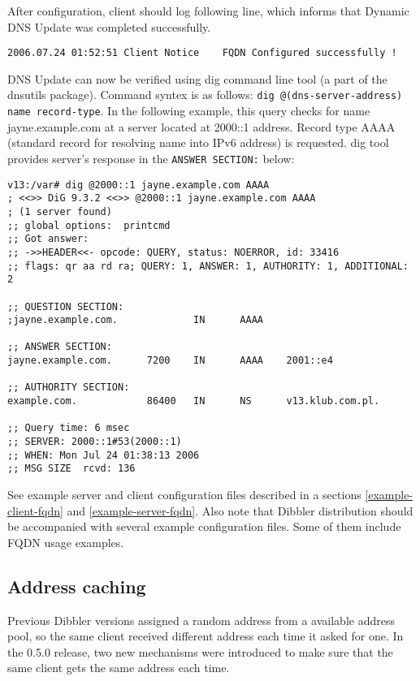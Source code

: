 After configuration, client should log following line, which informs
that Dynamic DNS Update was completed successfully.

\begin{verbatim}
2006.07.24 01:52:51 Client Notice    FQDN Configured successfully !
\end{verbatim}

DNS Update can now be verified using dig command line tool (a part of
the dnsutils package). Command syntex is as follows: \verb+dig @(dns-server-address) name record-type+. In the following example,
this query checks for name jayne.example.com at a server located at
2000::1 address. Record type AAAA (standard record for resolving name
into IPv6 address) is requested. dig tool provides server's response
in the \verb+ANSWER SECTION:+ below:

\begin{Verbatim}
v13:/var# dig @2000::1 jayne.example.com AAAA
; <<>> DiG 9.3.2 <<>> @2000::1 jayne.example.com AAAA
; (1 server found)
;; global options:  printcmd
;; Got answer:
;; ->>HEADER<<- opcode: QUERY, status: NOERROR, id: 33416
;; flags: qr aa rd ra; QUERY: 1, ANSWER: 1, AUTHORITY: 1, ADDITIONAL: 2

;; QUESTION SECTION:
;jayne.example.com.             IN      AAAA

;; ANSWER SECTION:
jayne.example.com.      7200    IN      AAAA    2001::e4

;; AUTHORITY SECTION:
example.com.            86400   IN      NS      v13.klub.com.pl.

;; Query time: 6 msec
;; SERVER: 2000::1#53(2000::1)
;; WHEN: Mon Jul 24 01:38:13 2006
;; MSG SIZE  rcvd: 136
\end{Verbatim}

See example server and client configuration files described in a
sections \ref{example-client-fqdn} and \ref{example-server-fqdn}. Also
note that Dibbler distribution should be accompanied with several
example configuration files. Some of them include FQDN usage examples.

\subsection{Address caching}
Previous Dibbler versions assigned a random address from a available
address pool, so the same client received different address each time it
asked for one. In the 0.5.0 release, two new mechanisms were introduced
to make sure that the same client gets the same address each time.


